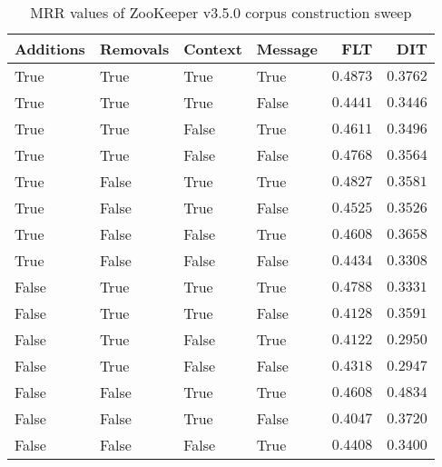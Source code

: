 
\begin{table}
\begin{spacing}{1.2}
\centering
\caption{MRR values of ZooKeeper v3.5.0 corpus construction sweep}
\label{table:zookeeper_corpus_sweep}
\vspace{0.2em}
\begin{tabular}{llll|rr}
\toprule
Additions & Removals & Context & Message & FLT &        DIT \\
\midrule
     True &     True &    True &    True &    $\bm{0.4873}$ &      $0.3762$ \\
     True &     True &    True &   False &         $0.4441$ &      $0.3446$ \\
     True &     True &   False &    True &         $0.4611$ &      $0.3496$ \\
     True &     True &   False &   False &         $0.4768$ &      $0.3564$ \\
     True &    False &    True &    True &         $0.4827$ &      $0.3581$ \\
     True &    False &    True &   False &         $0.4525$ &      $0.3526$ \\
     True &    False &   False &    True &         $0.4608$ &      $0.3658$ \\
     True &    False &   False &   False &         $0.4434$ &      $0.3308$ \\
    False &     True &    True &    True &         $0.4788$ &      $0.3331$ \\
    False &     True &    True &   False &         $0.4128$ &      $0.3591$ \\
    False &     True &   False &    True &         $0.4122$ &      $0.2950$ \\
    False &     True &   False &   False &         $0.4318$ &      $0.2947$ \\
    False &    False &    True &    True &         $0.4608$ & $\bm{0.4834}$ \\
    False &    False &    True &   False &         $0.4047$ &      $0.3720$ \\
    False &    False &   False &    True &         $0.4408$ &      $0.3400$ \\
\bottomrule
\end{tabular}

\end{spacing}
\end{table}
